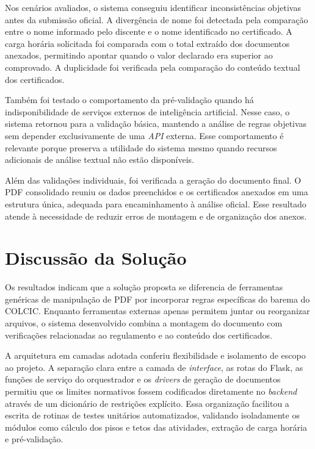 Nos cenários avaliados, o sistema conseguiu identificar inconsistências objetivas antes da submissão oficial. A divergência de nome foi detectada pela comparação entre o nome informado pelo discente e o nome identificado no certificado. A carga horária solicitada foi comparada com o total extraído dos documentos anexados, permitindo apontar quando o valor declarado era superior ao comprovado. A duplicidade foi verificada pela comparação do conteúdo textual dos certificados.

Também foi testado o comportamento da pré-validação quando há indisponibilidade de serviços externos de inteligência artificial. Nesse caso, o sistema retornou para a validação básica, mantendo a análise de regras objetivas sem depender exclusivamente de uma \textit{API} externa. Esse comportamento é relevante porque preserva a utilidade do sistema mesmo quando recursos adicionais de análise textual não estão disponíveis.

Além das validações individuais, foi verificada a geração do documento final. O PDF consolidado reuniu os dados preenchidos e os certificados anexados em uma estrutura única, adequada para encaminhamento à análise oficial. Esse resultado atende à necessidade de reduzir erros de montagem e de organização dos anexos.

\section{Discussão da Solução}

Os resultados indicam que a solução proposta se diferencia de ferramentas genéricas de manipulação de PDF por incorporar regras específicas do barema do COLCIC. Enquanto ferramentas externas apenas permitem juntar ou reorganizar arquivos, o sistema desenvolvido combina a montagem do documento com verificações relacionadas ao regulamento e ao conteúdo dos certificados.

A arquitetura em camadas adotada conferiu flexibilidade e isolamento de escopo ao projeto. A separação clara entre a camada de \textit{interface}, as rotas do Flask\texttrademark{}, as funções de serviço do orquestrador e os \textit{drivers} de geração de documentos permitiu que os limites normativos fossem codificados diretamente no \textit{backend} através de um dicionário de restrições explícito. Essa organização facilitou a escrita de rotinas de testes unitários automatizados, validando isoladamente os módulos como cálculo dos pisos e tetos das atividades, extração de carga horária e pré-validação.


